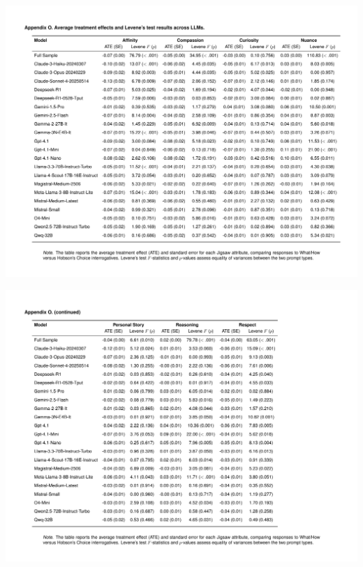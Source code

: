 \documentclass[
  12pt,
]{article}
\begin{document}
\includegraphics{../03_outputs/04_appendices/appendix_o_i.pdf}

\includegraphics{../03_outputs/04_appendices/appendix_o_ii.pdf}
\end{document}
